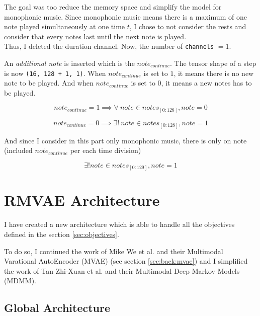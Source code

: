 \documentclass[12pt]{report}
\begin{document}
The goal was too reduce the memory space and simplify the model for monophonic music.
Since monophonic music means there is a maximum of one note played simultaneously at one time $t$, I chose to not consider the rests and consider that every notes last until the next note is played.\\
Thus, I deleted the duration channel.
Now, the number of \texttt{channels} $ = 1$.

An \textit{additional note} is inserted which is the $note_{continue}$.
The tensor shape of a step is now \texttt{(16, 128 + 1, 1)}.
When $note_{continue}$ is set to $1$, it means there is no new note to be played.
And when $note_{continue}$ is set to $0$, it means a new notes has to be played.

\begin{equation}
    note_{continue} = 1 \implies \forall~ note \in notes_{[0:128]}, note = 0
\end{equation}

\begin{equation}
    note_{continue} = 0 \implies \exists!~ note \in notes_{[0:128]}, note = 1
\end{equation}

And since I consider in this part only monophonic music, there is only on note (included $note_{continue}$ per each time division)

\begin{equation}
    \exists! note \in notes_{[0:129]}, note = 1
\end{equation}


\section{RMVAE Architecture}
\label{sec:rmvae}

I have created a new architecture which is able to handle all the objectives defined in the section \ref{sec:objectives}.

To do so, I continued the work of Mike We et al. \cite{wu_multimodal_2018} and their Multimodal Varational AutoEncoder (MVAE) (see section \ref{sec:back:mvae}) and I simplified the work of Tan Zhi-Xuan et al. \cite{tan_factorized_2019} and their Multimodal Deep Markov Models (MDMM).

\subsection{Global Architecture}
\end{document}
